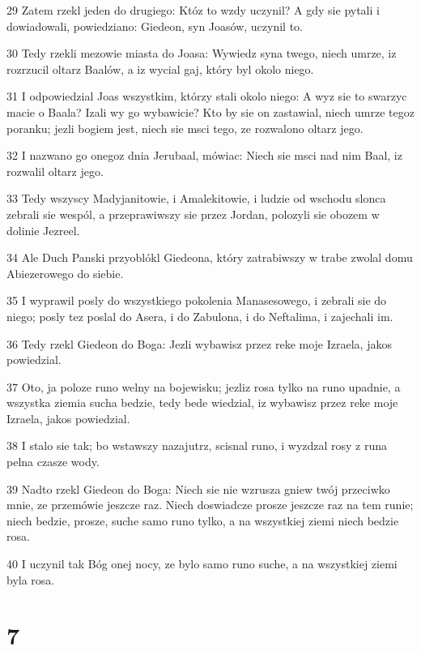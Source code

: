 \par 29 Zatem rzekl jeden do drugiego: Któz to wzdy uczynil? A gdy sie pytali i dowiadowali, powiedziano: Giedeon, syn Joasów, uczynil to.
\par 30 Tedy rzekli mezowie miasta do Joasa: Wywiedz syna twego, niech umrze, iz rozrzucil oltarz Baalów, a iz wycial gaj, który byl okolo niego.
\par 31 I odpowiedzial Joas wszystkim, którzy stali okolo niego: A wyz sie to swarzyc macie o Baala? Izali wy go wybawicie? Kto by sie on zastawial, niech umrze tegoz poranku; jezli bogiem jest, niech sie msci tego, ze rozwalono oltarz jego.
\par 32 I nazwano go onegoz dnia Jerubaal, mówiac: Niech sie msci nad nim Baal, iz rozwalil oltarz jego.
\par 33 Tedy wszyscy Madyjanitowie, i Amalekitowie, i ludzie od wschodu slonca zebrali sie wespól, a przeprawiwszy sie przez Jordan, polozyli sie obozem w dolinie Jezreel.
\par 34 Ale Duch Panski przyoblókl Giedeona, który zatrabiwszy w trabe zwolal domu Abiezerowego do siebie.
\par 35 I wyprawil posly do wszystkiego pokolenia Manasesowego, i zebrali sie do niego; posly tez poslal do Asera, i do Zabulona, i do Neftalima, i zajechali im.
\par 36 Tedy rzekl Giedeon do Boga: Jezli wybawisz przez reke moje Izraela, jakos powiedzial.
\par 37 Oto, ja poloze runo welny na bojewisku; jezliz rosa tylko na runo upadnie, a wszystka ziemia sucha bedzie, tedy bede wiedzial, iz wybawisz przez reke moje Izraela, jakos powiedzial.
\par 38 I stalo sie tak; bo wstawszy nazajutrz, scisnal runo, i wyzdzal rosy z runa pelna czasze wody.
\par 39 Nadto rzekl Giedeon do Boga: Niech sie nie wzrusza gniew twój przeciwko mnie, ze przemówie jeszcze raz. Niech doswiadcze prosze jeszcze raz na tem runie; niech bedzie, prosze, suche samo runo tylko, a na wszystkiej ziemi niech bedzie rosa.
\par 40 I uczynil tak Bóg onej nocy, ze bylo samo runo suche, a na wszystkiej ziemi byla rosa.

\chapter{7}

